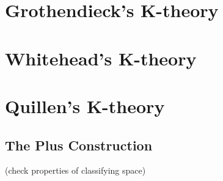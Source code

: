 






\chapter{Grothendieck's K-theory}





\chapter{Whitehead's K-theory}

\chapter{Quillen's K-theory}

\section{The Plus Construction}
(check properties of classifying space)

